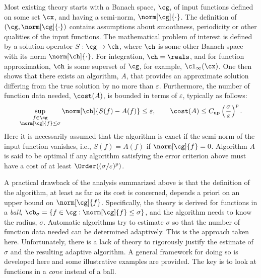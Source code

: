 \documentclass[final]{elsarticle}
\theoremstyle{definition}
\theoremstyle{remark}
\DeclareMathOperator{\up}{up}
\begin{document}
Most existing theory starts with a Banach space, $\cg$, of input functions defined on some set $\cx$, and having a semi-norm, $\norm[\cg]{\cdot}$.  The definition of $(\cg,\norm[\cg]{\cdot})$ contains assumptions about smoothness, periodicity or other qualities of the input functions.  The mathematical problem of interest is defined by a solution operator $S:\cg \to \ch$, where $\ch$ is some other Banach space with its norm $\norm[\ch]{\cdot}$.  For integration, $\ch=\reals$, and for function approximation, $\ch$ is some superset of $\cg$, for example, $\cl_{\infty}(\cx)$. One then shows that there exists an algorithm, $A$, that provides an approximate solution differing from the true solution by no  more than $\varepsilon$.  Furthermore, the number of function data needed, $\cost(A)$, is bounded in terms of $\varepsilon$, typically as follows:
\begin{equation} \label{traditionerr}
\sup_{\substack{f \in \cg\\ \norm[\cg]{f} \le \sigma}} \norm[\ch]{S(f)-A(f)} \le \varepsilon, \qquad \cost(A)\le C_{\up}\left(\frac{\sigma}{\varepsilon}\right)^{p}.
\end{equation}
Here it is necessarily assumed that the algorithm is exact if the semi-norm of the input function vanishes, i.e., $S(f)=A(f)$ if $\norm[\cg]{f}=0$. Algorithm $A$ is said to be optimal if any algorithm satisfying the error criterion above must have a cost of at least $\Order((\sigma/\varepsilon)^{p})$.

A practical drawback of the analysis summarized above is that the definition of the algorithm, at least as far as its cost is concerned, depends a priori on an upper bound on $\norm[\cg]{f}$. Specifically, the theory is derived for functions in a \emph{ball}, $\cb_\sigma=\{ f \in \cg : \norm[\cg]{f} \le \sigma\}$, and the algorithm needs to know the radius, $\sigma$. Automatic algorithms try to estimate $\sigma$ so that the number of function data needed can be determined adaptively.  This is the approach taken here.  Unfortunately, there is a lack of theory to rigorously justify the estimate of $\sigma$ and the resulting adaptive algorithm.  A general framework for doing so is developed here and some illustrative examples are provided. The key is to look at functions in a \emph{cone} instead of a ball.
\end{document}
